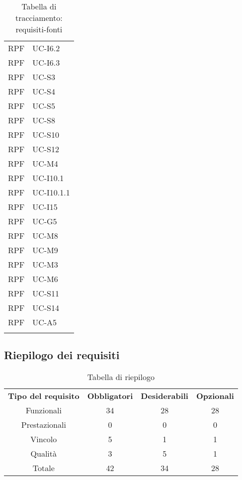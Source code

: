 \begin{longtable}{| p{5cm} | p{5cm} |}
		RPF & UC-I6.2\\
		\rowcolor{LightGray}
		RPF & UC-I6.3\\
		RPF & UC-S3\\
		\rowcolor{LightGray}
		RPF & UC-S4\\
		RPF & UC-S5\\
		\rowcolor{LightGray}
		RPF & UC-S8\\
		RPF & UC-S10\\
		\rowcolor{LightGray}
		RPF & UC-S12\\
		RPF & UC-M4\\
		\rowcolor{LightGray}
		RPF & UC-I10.1\\
		RPF & UC-I10.1.1\\
		\rowcolor{LightGray}
		RPF & UC-I15\\
		\rowcolor{LightGray}
		RPF & UC-G5\\
		RPF & UC-M8\\
		\rowcolor{LightGray}
		RPF & UC-M9\\
		RPF & UC-M3\\
		\rowcolor{LightGray}
		RPF & UC-M6\\
		RPF & UC-S11\\	
		\rowcolor{LightGray}
		RPF & UC-S14\\
		RPF & UC-A5\\
		\rowcolor{LightGray}
		\hline
		\caption{Tabella di tracciamento: requisiti-fonti}
\end{longtable}

\subsection{Riepilogo dei requisiti}
\begin{table}[h]
\centering
\begin{tabular}{| c | c | c | c |}
		\rowcolor{LightBlue}
		\color{white}\bfseries Tipo del requisito & \color{white}\bfseries Obbligatori & \color{white}\bfseries Desiderabili & \color{white}\bfseries Opzionali \\[0.25cm]
		 Funzionali & 34 & 28 & 28 \\
		 Prestazionali & 0 & 0 & 0 \\
		 Vincolo & 5 & 1 & 1 \\
		 Qualità & 3 & 5 & 1 \\
		 Totale & 42 & 34 & 28 \\ \hline
\end{tabular}
		\caption{Tabella di riepilogo}
\end{table}


\newpage